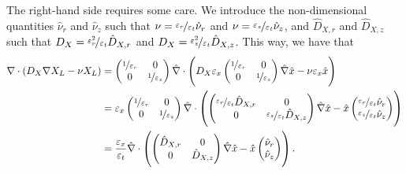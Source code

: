 \documentclass[11pt]{article}
\numberwithin{equation}{section}
\begin{document}
The right-hand side requires some care. 
We introduce the non-dimensional quantities \( \hat{\nu}_r\) and \( \hat{\nu}_z\) such that \( \nu = \nicefrac{\varepsilon_r}{\varepsilon_t} \hat{\nu}_r \) and \( \nu = \nicefrac{\varepsilon_z}{\varepsilon_t} \hat{\nu}_z \),
and \(\hat{D}_{X,r}\) and \(\hat{D}_{X,z}\) 
such that \(D_{X} = \nicefrac{\varepsilon_r^2}{\varepsilon_t} \hat{D}_{X,r}\) and \(D_{X} = \nicefrac{\varepsilon_z^2}{\varepsilon_t} \hat{D}_{X,z}\). This way, we have that
\begin{align}
    \nabla \cdot ( D_X \nabla X_L - \nu X_L  )
    &=
    \begin{pmatrix}
        \nicefrac{1}{\varepsilon_r} & 0 \\
        0 & \nicefrac{1}{\varepsilon_z}
    \end{pmatrix}
    \hat{\nabla}
    \cdot
    \left( 
        D_X
        \varepsilon_x
        \begin{pmatrix}
        \nicefrac{1}{\varepsilon_r} & 0 \\
        0 & \nicefrac{1}{\varepsilon_z}
    \end{pmatrix}
    \hat{\nabla} \hat{x} - \nu \varepsilon_x \hat{x}
    \right)
    \notag
    \\
    &= \varepsilon_x
    \begin{pmatrix}
        \nicefrac{1}{\varepsilon_r} & 0 \\
        0 & \nicefrac{1}{\varepsilon_z}
    \end{pmatrix}
    \hat{\nabla}
    \cdot
    \left( 
        \begin{pmatrix}
         \nicefrac{\varepsilon_r}{\varepsilon_t} \hat{D}_{X,r} & 0 
         \\
        0 &  \nicefrac{\varepsilon_z}{\varepsilon_t} \hat{D}_{X,z}
    \end{pmatrix}
    \hat{\nabla} \hat{x} - \hat{x}
    \begin{pmatrix}
         \nicefrac{\varepsilon_r}{\varepsilon_t} \hat{\nu}_{r} 
         \\
        \nicefrac{\varepsilon_z}{\varepsilon_t} \hat{\nu}_{z}
    \end{pmatrix}
    \right)
    \notag
    \\
    &= \frac{\varepsilon_x}{\varepsilon_t}
    \hat{\nabla}
    \cdot
    \left( 
        \begin{pmatrix}
         \hat{D}_{X,r} & 0 
         \\
        0 &  \hat{D}_{X,z}
    \end{pmatrix}
    \hat{\nabla} \hat{x} - \hat{x}
    \begin{pmatrix}
         \hat{\nu}_{r} 
         \\
        \hat{\nu}_{z}
    \end{pmatrix}
    \right).
    \label{eq:divergence-non-dimen-x}
\end{align}
\end{document}
